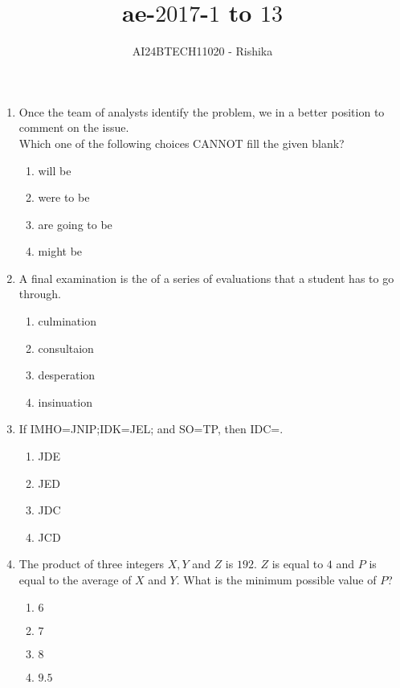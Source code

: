 \documentclass[journal,12pt,onecolumn]{IEEEtran}
\theoremstyle{remark}
\begin{document}

\vspace{3cm}

\title{ae-$2017$-$1$ to $13$}
\author{AI24BTECH11020 - Rishika}
\maketitle
\bigskip
\renewcommand{\thefigure}{\theenumi}
\renewcommand{\thetable}{\theenumi}
\begin{enumerate}
	\item Once the team of analysts identify the problem, we \underline{\hspace{2cm}} in a better position to comment on the issue.\\Which one of the following choices CANNOT fill the given blank?
		\begin{enumerate}
			\item will be
			\item were to be
			\item are going to be 
			\item might be
		\end{enumerate}
	\item A final examination is the \underline{\hspace{2cm}} of a series of evaluations that a student has to go through.
		\begin{enumerate}                           
                        \item culmination                
                        \item consultaion               
                        \item desperation
                        \item insinuation
                \end{enumerate}

	\item If IMHO=JNIP;IDK=JEL; and SO=TP, then IDC=\underline{\hspace{2cm}}.
		\begin{enumerate}                           
                        \item JDE                  
                     \item JED
                        \item JDC
                        \item JCD
                \end{enumerate}
	\item The product of three integers $X,Y$ and $Z$ is $192$. $Z$ is equal to $4$ and $P$ is equal to the average of $X$ and $Y$. What is the minimum possible value of $P$?
		\begin{enumerate}                           
                        \item $6$                          
                        \item $7$                        
                        \item $8$
                        \item $9.5$
                \end{enumerate}


\end{enumerate}
\end{document}

